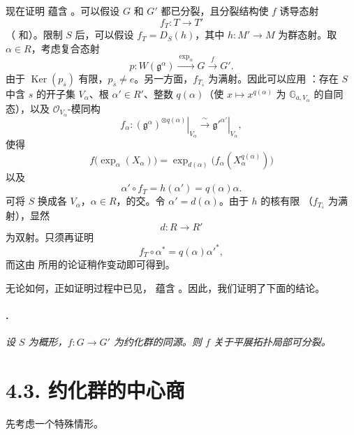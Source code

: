 现在证明 \textup{} 蕴含 \textup{}。可以假设 \(G\) 和 \(G'\) 都已分裂，且分裂结构使 \(f\) 诱导态射
\[
  f_T:T\longrightarrow T'
\]
\textup{（ 和）}。限制 \(S\) 后，可以假设 \(f_T=D_S(h)\)，其中 \(h:M'\to M\) 为群态射。取 \(\alpha\in R\)，考虑复合态射
\[
  p:
  W(\mathfrak g^\alpha)
  \xrightarrow{\ \exp_\alpha\ }
  G
  \xrightarrow{\ f\ }
  G'.
\]
由于 \(\operatorname{Ker}(p_{\bar s})\) 有限，\(p_{\bar s}\ne e\)。另一方面，\(f_{T_{\bar s}}\) 为满射。因此可以应用 ：存在 \(S\) 中含 \(s\) 的开子集 \(V_\alpha\)、根 \(\alpha'\in R'\)、整数 \(q(\alpha)\)（使 \(x\mapsto x^{q(\alpha)}\) 为 \(\mathbb G_{a,V_\alpha}\) 的自同态），以及 \(\mathcal O_{V_\alpha}\)-模同构
\[
  f_\alpha:
  \left.(\mathfrak g^\alpha)^{\otimes q(\alpha)}
  \right|_{V_\alpha}
  \xrightarrow{\ \sim\ }
  \left.\mathfrak g'^{\alpha'}\right|_{V_\alpha},
\]
使得
\[
  f\bigl(\exp_\alpha(X_\alpha)\bigr)
  =
  \exp_{d(\alpha)}
  \bigl(f_\alpha(X_\alpha^{q(\alpha)})\bigr)
\]
以及
\[
  \alpha'\circ f_T=h(\alpha')=q(\alpha)\alpha.
\]
可将 \(S\) 换成各 \(V_\alpha\)，\(\alpha\in R\)，的交。令 \(\alpha'=d(\alpha)\)。由于 \(h\) 的核有限 \textup{（\(f_{T_{\bar s}}\) 为满射）}，显然
\[
  d:R\longrightarrow R'
\]
为双射。只须再证明
\[
  f_T\circ\alpha^*=q(\alpha)\alpha'^*,
\]
而这由 所用的论证稍作变动即可得到。

无论如何，正如证明过程中已见，\textup{} 蕴含 \textup{}。因此，我们证明了下面的结论。

\paragraph{.}
\textit{设 \(S\) 为概形，\(f:G\to G'\) 为约化群的同源。则 \(f\) 关于平展拓扑局部可分裂。}

\section*{4.3. 约化群的中心商}

先考虑一个特殊情形。

